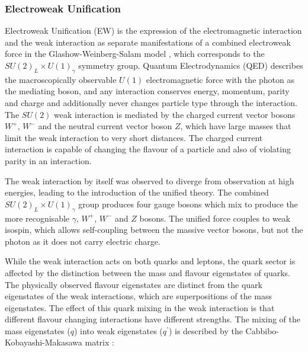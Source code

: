 		\subsubsection{Electroweak Unification}

		Electroweak Unification (EW) is the expression of the electromagnetic interaction and the weak interaction as separate manifestations of a combined electroweak force in the Glashow-Weinberg-Salam model \cite{gws-g, gws-w, gws-s}, which corresponds to the $SU(2)_L\times U(1)_\gamma$ symmetry group. Quantum Electrodynamics (QED) describes the macroscopically observable $U(1)$ electromagnetic force  with the photon as the mediating boson, and any interaction conserves energy, momentum, parity and charge and additionally never changes particle type through the interaction. The $SU(2)$ weak interaction is mediated by the charged current vector bosons $W^+$, $W^-$ and the neutral current vector boson $Z$, which have large masses that limit the weak interaction to very short distances. The charged current interaction is capable of changing the flavour of a particle and also of violating parity in an interaction.

		The weak interaction by itself was observed to diverge from observation at high energies, leading to the introduction of the unified theory. The combined  $SU(2)_L\times U(1)_\gamma$ group produces four gauge bosons which mix to produce the more recognisable $\gamma$, $W^+$, $W^-$  and $Z$ bosons. The unified force couples to weak isospin, which allows self-coupling between the massive vector bosons, but not the photon as it does not carry electric charge.

		While the weak interaction acts on both quarks and leptons, the quark sector is affected by the distinction between the mass and flavour eigenstates of quarks. The physically observed flavour eigenstates are distinct from the quark eigenstates of the weak interactions, which are superpositions of the mass eigenstates. The effect of this quark mixing in the weak interaction is that different flavour changing interactions have different strengths. The mixing of the mass eigenstates ($q$) into weak eigenstates ($q^\prime$) is described by the Cabbibo-Kobayashi-Makasawa matrix \cite{ckm-c, ckm-km}:

